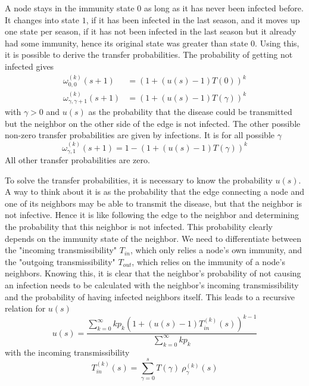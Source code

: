 \documentclass[11pt, a4paper]{article}
\begin{document}
A node stays in the immunity state $0$ as long as it has never been infected before. It changes into state $1$, if it has been infected in the last season, and it moves up one state per season, if it has not been infected in the last season but it already had some immunity, hence its original state was greater than state $0$. Using this, it is possible to derive the transfer probabilities. The probability of getting not infected gives
\begin{equation}
\begin{split}
\omega_{0, 0}^{(k)} (s + 1) & = \left( 1 +(u(s) - 1) T(0) \right)^{k} \\
\omega_{\gamma, \gamma+1}^{(k)} (s + 1) & = \left( 1 +(u(s) - 1) T(\gamma)  \right)^{k}
\end{split}
\end{equation}
with $\gamma > 0$ and $u(s)$ as the probability that the disease could be transmitted but the neighbor on the other side of the edge is not infected. The other possible non-zero transfer probabilities are given by infections. It is for all possible $\gamma$
\begin{equation}
\omega_{\gamma, 1}^{(k)} (s + 1) = 1 - \left( 1 +(u(s) - 1) T(\gamma)  \right)^{k}
\end{equation}
All other transfer probabilities are zero.

To solve the transfer probabilities, it is necessary to know the probability $u (s)$. A way to think about it is as the probability that the edge connecting a node and one of its neighbors may be able to transmit the disease, but that the neighbor is not infective. Hence it is like following the edge to the neighbor and determining the probability that this neighbor is not infected. This probability clearly depends on the immunity state of the neighbor. We need to differentiate between the "incoming transmissibility" $T_{in}$, which only relies a node's own immunity, and the "outgoing transmissibility" $T_{out}$, which relies on the immunity of a node's neighbors. Knowing this, it is clear that the neighbor's probability of not causing an infection needs to be calculated with the neighbor's incoming transmissibility and the probability of having infected neighbors itself. This leads to a recursive relation for $u (s)$
\begin{equation}
u (s) = \frac{ \sum\limits_{k=0}^{\infty} k p_k \left( 1 +(u(s) - 1) T_{in} ^{(k)}(s)  \right) ^{k-1}}{\sum\limits_{k=0}^{\infty} k p_k}
\end{equation}
with the incoming transmissibility
\begin{equation}
T_{in}^{(k)} (s)  = \sum\limits_{\gamma = 0}^{s} T (\gamma) \: \rho_{\gamma}^{(k)}(s)
\end{equation}
\end{document}
